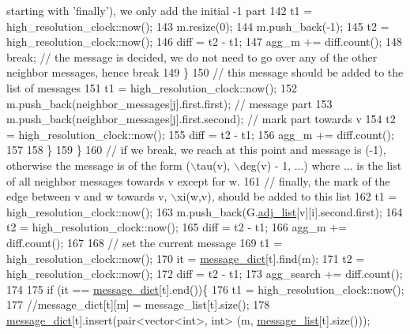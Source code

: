 \begin{DoxyCode}
{       starting with 'finally'), we only add the initial -1 part}
142                 t1 = high\_resolution\_clock::now();
143                 m.resize(0);
144                 m.push\_back(-1);
145                 t2 = high\_resolution\_clock::now();
146                 diff = t2 - t1;
147                 agg\_m += diff.count();
148                 \textcolor{keywordflow}{break}; \textcolor{comment}{// the message is decided, we do not need to go over any of the other neighbor
       messages, hence break}
149               \}
150               \textcolor{comment}{// this message should be added to the list of messages}
151               t1 = high\_resolution\_clock::now();
152               m.push\_back(neighbor\_messages[j].first.first); \textcolor{comment}{// message part}
153               m.push\_back(neighbor\_messages[j].first.second); \textcolor{comment}{// mark part towards v}
154               t2 = high\_resolution\_clock::now();
155               diff = t2 - t1;
156               agg\_m += diff.count();
157 
158             \}
159           \}
160           \textcolor{comment}{// if we break, we reach at this point and message is (-1), otherwise the message is of the form
       (\(\backslash\)tau(v), \(\backslash\)deg(v) - 1, ...) where ... is the list of all neighbor messages towards v except for w. }
161           \textcolor{comment}{// finally, the mark of the edge between v and w towards v, \(\backslash\)xi(w,v), should be added to this
       list}
162           t1 = high\_resolution\_clock::now();
163           m.push\_back(G.\hyperlink{classmarked__graph_a1a0bf7ca413a278763f7c878b3b6fd6f}{adj\_list}[v][i].second.first);
164           t2 = high\_resolution\_clock::now();
165           diff = t2 - t1;
166           agg\_m += diff.count();
167 
168           \textcolor{comment}{// set the current message}
169           t1 = high\_resolution\_clock::now();
170           it = \hyperlink{classgraph__message_ab54d89b122c2b1322da0d5db2043fb84}{message\_dict}[t].find(m);
171           t2 = high\_resolution\_clock::now();
172           diff = t2 - t1;
173           agg\_search += diff.count();
174 
175           \textcolor{keywordflow}{if} (it == \hyperlink{classgraph__message_ab54d89b122c2b1322da0d5db2043fb84}{message\_dict}[t].end())\{
176             t1 = high\_resolution\_clock::now();
177             \textcolor{comment}{//message\_dict[t][m] = message\_list[t].size();}
178             \hyperlink{classgraph__message_ab54d89b122c2b1322da0d5db2043fb84}{message\_dict}[t].insert(pair<vector<int>, \textcolor{keywordtype}{int}> (m, 
      \hyperlink{classgraph__message_aa17fdb629b423343edfafa97252763ef}{message\_list}[t].size()));

\end{DoxyCode}
